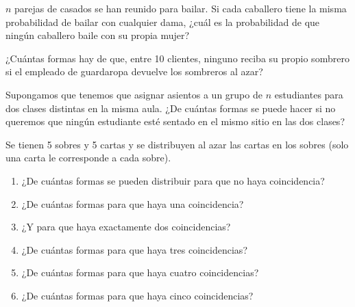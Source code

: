 \documentclass[12pt]{article}
\begin{document}
\begin{ejercicio}
    $n$ parejas de casados se han reunido para bailar. Si cada caballero tiene la misma probabilidad de bailar con cualquier dama, ¿cuál es la probabilidad de que ningún caballero baile con su propia mujer?
\end{ejercicio}

\begin{ejercicio}
    ¿Cuántas formas hay de que, entre 10 clientes, ninguno reciba su propio sombrero si el empleado de guardaropa devuelve los sombreros al azar?
\end{ejercicio}

\begin{ejercicio}
    Supongamos que tenemos que asignar asientos a un grupo de $n$ estudiantes para dos clases distintas en la misma aula. ¿De cuántas formas se puede hacer si no queremos que ningún estudiante esté sentado en el mismo sitio en las dos clases?
\end{ejercicio}

\begin{ejercicio}
    Se tienen 5 sobres y 5 cartas y se distribuyen al azar las cartas en los sobres (solo una carta le corresponde a cada sobre).

    \renewcommand{\labelenumi}{\alph{enumi})}
    \begin{enumerate}
        \item ¿De cuántas formas se pueden distribuir para que no haya coincidencia?
        \item ¿De cuántas formas para que haya una coincidencia?
        \item ¿Y para que haya exactamente dos coincidencias?
        \item ¿De cuántas formas para que haya tres coincidencias?
        \item ¿De cuántas formas para que haya cuatro coincidencias?
        \item ¿De cuántas formas para que haya cinco coincidencias?
    \end{enumerate}
\end{ejercicio}
\end{document}
